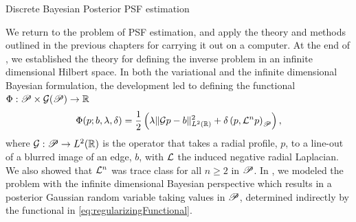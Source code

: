 
\begin{chapter}{Discrete Bayesian Posterior PSF estimation} \label{chapter:computational}

We return to the problem of PSF estimation, and apply the theory and methods outlined in the previous chapters for carrying it out on a computer.
At the end of , we established the theory for defining the inverse problem in an infinite dimensional Hilbert space. 
In both the variational and the infinite dimensional Bayesian formulation, the development led to defining the functional $\Phi:\mathscr P \times \mathcal G(\mathscr P) \to \mathbb R$
\begin{equation} \label{eq:regularizingFunctional}
  \Phi(p; b,\lambda,\delta) = \frac 12 \left(\lambda\|\mathcal G p - b\|_{L^2(\mathbb R)}^2 + \delta\left( p, \mathcal L^n p\right)_{\mathscr P}\right),
\end{equation}
where $\mathcal G:\mathscr P \to L^2(\mathbb R)$ is the operator that takes a radial profile, $p$, to a line-out of a blurred image of an edge, $b$, with $\mathcal L$ the induced negative radial Laplacian. 
We also showed that $\mathcal L^n$ was trace class for all $n\ge2$ in $\mathscr P$. %
In , we modeled the problem with the infinite dimensional Bayesian perspective 
which results in a posterior Gaussian random variable taking values in $\mathscr P$, determined indirectly by the functional in \eqref{eq:regularizingFunctional}.


\end{chapter}

